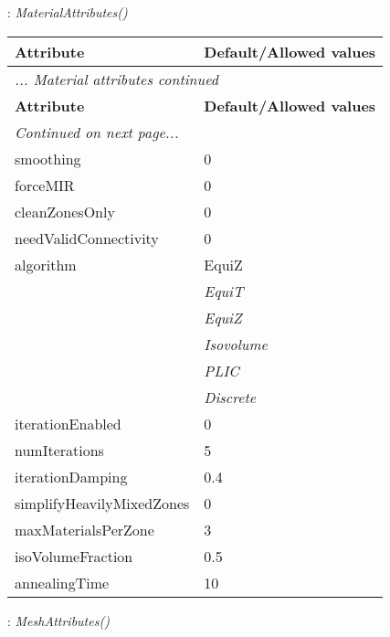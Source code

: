 \documentclass[10pt,a4paper]{report}
\begin{document}
\newpage

{}
: {\it MaterialAttributes() }\\[-3mm]

\begin{longtable}{ll}
{\bf Attribute} & {\bf Default/Allowed values} \\
\hline \hline
\endfirsthead
\multicolumn{2}{l}{{\it ... Material attributes continued}} \\
{\bf Attribute} & {\bf Default/Allowed values} \\
\hline \hline
\endhead
\hline
\multicolumn{2}{l}{{\it Continued on next page...}} \\
\endfoot
\hline
\endlastfoot

smoothing  &  0 \\
forceMIR  &  0 \\
cleanZonesOnly  &  0 \\
needValidConnectivity  &  0 \\
algorithm  &  EquiZ   \\
 & {\it  EquiT} \\
 & {\it  EquiZ} \\
 & {\it  Isovolume} \\
 & {\it  PLIC} \\
 & {\it  Discrete} \\
iterationEnabled  &  0 \\
numIterations  &  5 \\
iterationDamping  &  0.4 \\
simplifyHeavilyMixedZones  &  0 \\
maxMaterialsPerZone  &  3 \\
isoVolumeFraction  &  0.5 \\
annealingTime  &  10 \\
\end{longtable}

\newpage

{}
: {\it MeshAttributes() }\\[-3mm]
\end{document}
